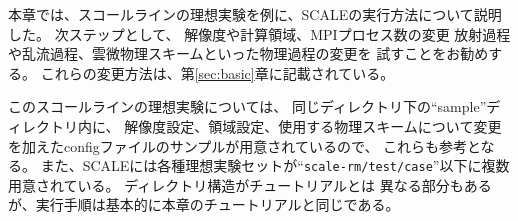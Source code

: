 本章では、スコールラインの理想実験を例に、SCALEの実行方法について説明した。
次ステップとして、
解像度や計算領域、MPIプロセス数の変更
放射過程や乱流過程、雲微物理スキームといった物理過程の変更を
試すことをお勧めする。
これらの変更方法は、第\ref{sec:basic}章に記載されている。

このスコールラインの理想実験については、
同じディレクトリ下の``sample''ディレクトリ内に、
解像度設定、領域設定、使用する物理スキームについて変更を加えたconfigファイルのサンプルが用意されているので、
これらも参考となる。
また、SCALEには各種理想実験セットが``\verb|scale-rm/test/case|''以下に複数用意されている。
ディレクトリ構造がチュートリアルとは
異なる部分もあるが、実行手順は基本的に本章のチュートリアルと同じである。


